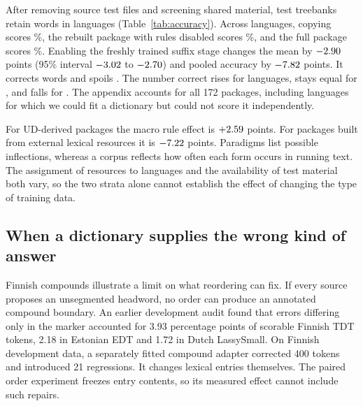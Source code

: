 \documentclass[11pt]{article}
\begin{document}
\begin{table}[t]
\centering\small

\caption{Fresh single-resource packages on the screened UD 2.19 tests.
Each row uses the same test tokens for all three columns. Resource strata
contain \catUd{} scored UD-derived and \catExt{} external-resource languages.}
\label{tab:accuracy}
\end{table}

After removing \catOmitted{} source test files and screening shared
material, \catFiles{} test treebanks retain \catN{} words in \catLang{}
languages (Table~\ref{tab:accuracy}). Across languages, copying scores
\catCopy\%, the rebuilt package with rules disabled scores \catOff\%, and
the full package scores \catFull\%. Enabling the freshly trained suffix
stage changes the mean by $-2.90$ points (95\% interval $-3.02$ to
$-2.70$) and pooled accuracy by $-7.82$ points. It corrects
\catCorr{} words and spoils \catReg{}. The number correct rises for
\catWins{} languages, stays equal for \catTies{}, and falls for \catLosses{}.
The appendix accounts for all 172 packages, including languages for which
we could fit a dictionary but could not score it independently.

For UD-derived packages the macro rule effect is $+2.59$ points. For
packages built from external lexical resources it is $-7.22$ points.
Paradigms list possible inflections, whereas a corpus reflects how often
each form occurs in running text. The assignment of resources to languages
and the availability of test material both vary, so the two strata alone
cannot establish the effect of changing the type of training data.

\subsection{When a dictionary supplies the wrong kind of answer}

Finnish compounds illustrate a limit on what reordering can fix. If every
source proposes an unsegmented headword, no order can produce an annotated
compound boundary. An earlier development audit found that errors differing
only in the marker accounted for 3.93 percentage points of scorable Finnish
TDT tokens, 2.18 in Estonian EDT and 1.72 in Dutch LassySmall. On Finnish
development data, a separately fitted compound adapter corrected 400 tokens
and introduced 21 regressions. It changes lexical entries themselves. The
paired order experiment freezes entry contents, so its measured effect
cannot include such repairs.
\end{document}
